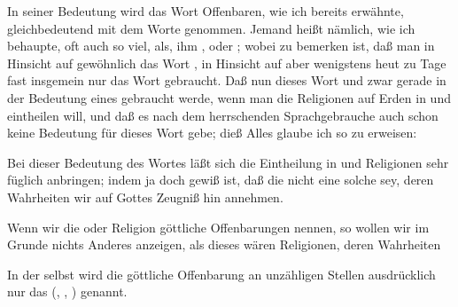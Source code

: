 \begin{aufza} 
\item In seiner  Bedeutung wird das Wort Offenbaren, wie ich bereits erwähnte, gleichbedeutend mit dem Worte  genommen. Jemand  heißt nämlich, wie ich behaupte, oft auch so viel, als, ihm , oder ; wobei zu bemerken ist, daß man in Hinsicht auf  gewöhnlich das Wort , in Hinsicht auf  aber wenigstens heut zu Tage fast insgemein nur das Wort  gebraucht. Daß nun dieses Wort  und zwar gerade  in der Bedeutung eines  gebraucht werde, wenn man die Religionen auf Erden in  und  eintheilen will, und daß es nach dem herrschenden Sprachgebrauche auch schon keine  Bedeutung für dieses Wort gebe; dieß Alles glaube ich so zu erweisen:~
\begin{aufzb} 
\item Bei dieser Bedeutung des Wortes  läßt sich die Eintheilung in  und  Religionen sehr füglich anbringen; indem ja doch gewiß ist, daß die  nicht eine solche sey, deren Wahrheiten wir auf Gottes Zeugniß hin annehmen.
\item Wenn wir die  oder  Religion göttliche Offenbarungen nennen, so wollen wir im Grunde nichts Anderes anzeigen, als dieses wären Religionen, deren Wahrheiten 
\item In der  selbst wird die göttliche Offenbarung an unzähligen Stellen ausdrücklich nur das  (, , ) genannt.
\end{aufzb}

\end{aufza}
